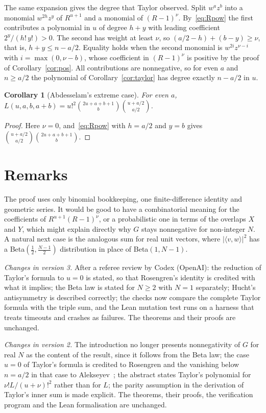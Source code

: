 \documentclass[11pt]{amsart}
\newtheorem{corollary}[theorem]{Corollary}
\theoremstyle{remark}
\begin{document}
The same expansion gives the degree that Taylor observed. Split $w^az^b$ into a monomial $w^{2h}z^y$ of $R^{u+1}$ and a monomial of $(R-1)^\nu$. By~\eqref{eq:Rpow} the first contributes a polynomial in $u$ of degree $h+y$ with leading coefficient $2^y/(h!\,y!)>0$. The second has weight at least $\nu$, so $(a/2-h)+(b-y)\ge\nu$, that is, $h+y\le n-a/2$. Equality holds when the second monomial is $w^{2i}z^{\nu-i}$ with $i=\max(0,\nu-b)$, whose coefficient in $(R-1)^\nu$ is positive by the proof of Corollary~\ref{cor:pos}. All contributions are nonnegative, so for even $a$ and $n\ge a/2$ the polynomial of Corollary~\ref{cor:taylor} has degree exactly $n-a/2$ in $u$.

\begin{corollary}[Abdesselam's extreme case]
For even $a$, $L(u,a,b,a+b)=u!^2\binom{2u+a+b+1}b\binom{u+a/2}{a/2}$.
\end{corollary}

\begin{proof}
Here $\nu=0$, and~\eqref{eq:Rpow} with $h=a/2$ and $y=b$ gives $\binom{u+a/2}{a/2}\binom{2u+a+b+1}b$.
\end{proof}

\section{Remarks}\label{sec:remarks}

The proof uses only binomial bookkeeping, one finite-difference identity and geometric series. It would be good to have a combinatorial meaning for the coefficients of $R^{u+1}(R-1)^\nu$, or a probabilistic one in terms of the overlaps $X$ and $Y$, which might explain directly why $G$ stays nonnegative for non-integer $N$. A natural next case is the analogous sum for real unit vectors, where $|\langle v,w\rangle|^2$ has a Beta$(\tfrac12,\tfrac{N-1}2)$ distribution in place of Beta$(1,N-1)$.

\emph{Changes in version 3.} After a referee review by Codex (OpenAI): the reduction of Taylor's formula to $u=0$ is stated, so that Rosengren's identity is credited with what it implies; the Beta law is stated for $N\ge2$ with $N=1$ separately; Hucht's antisymmetry is described correctly; the checks now compare the complete Taylor formula with the triple sum, and the Lean mutation test runs on a harness that treats timeouts and crashes as failures. The theorems and their proofs are unchanged.

\emph{Changes in version 2.} The introduction no longer presents nonnegativity of $G$ for real $N$ as the content of the result, since it follows from the Beta law; the case $u=0$ of Taylor's formula is credited to Rosengren and the vanishing below $n=a/2$ in that case to Alekseyev~\cite{MO2}; the abstract states Taylor's polynomial for $\nu!L/(u+\nu)!^2$ rather than for $L$; the parity assumption in the derivation of Taylor's inner sum is made explicit. The theorems, their proofs, the verification program and the Lean formalisation are unchanged.
\end{document}
